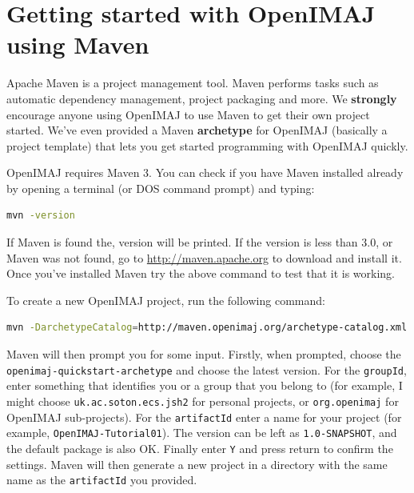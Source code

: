 \chapter{Getting started with OpenIMAJ using Maven}
\pagestyle{headings}
Apache Maven is a project management tool.  Maven performs tasks such 
as automatic  dependency management, project packaging and more. We \textbf{strongly} 
encourage anyone using OpenIMAJ to use Maven to get their own project started. 
We've even provided a Maven \textbf{archetype} for OpenIMAJ (basically a project template) 
that lets you get started programming with OpenIMAJ quickly. 

OpenIMAJ requires Maven 3. You can check if you have Maven installed already 
by opening a terminal (or DOS command prompt) and typing:
\begin{lstlisting}[language=bash]
mvn -version
\end{lstlisting}
If Maven is found the, version will be printed. If the version is less than 3.0, 
or Maven was not found, go to \url{http://maven.apache.org} to download and 
install it. Once you've installed Maven try the above command to test that it 
is working.

To create a new OpenIMAJ project, run the following command:
\begin{lstlisting}[language=bash]
mvn -DarchetypeCatalog=http://maven.openimaj.org/archetype-catalog.xml archetype:generate
\end{lstlisting}

Maven will then prompt you for some input.  Firstly, when prompted, choose 
the \texttt{openimaj-quickstart-archetype} and choose the latest version. For the \verb+groupId+, 
enter something that identifies you or a group that you belong to (for example, I might choose 
\verb+uk.ac.soton.ecs.jsh2+ for personal projects, or \verb+org.openimaj+ for OpenIMAJ sub-projects). 
For the \verb+artifactId+ enter a name for your project (for example, \verb+OpenIMAJ-Tutorial01+). The 
version can be left as \verb+1.0-SNAPSHOT+, and the default package is also OK. Finally enter \verb+Y+ and press return
to confirm the settings. Maven will then generate a new project in a directory with the same 
name as the \verb+artifactId+ you provided.

